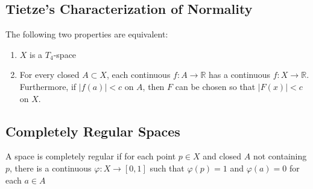 \documentclass[12pt]{article} %
\begin{document}
\subsection{Tietze's Characterization of Normality}

\begin{theorem}\parencite{Dugundji1966} The following two properties are equivalent:
\begin{enumerate}
    \item $X$ is a $T_4$-space
    \item For every closed $A \subset X$, each continuous $f:A \to \mathbb{R}$ has a continuous $f:X\to \mathbb{R}$. Furthermore, if $|f(a)|<c$ on $A$, then $F$ can be chosen so that $|F(x)|<c$ on $X$.
\end{enumerate}
\end{theorem}



\subsection{Completely Regular Spaces}

\begin{definition}\parencite{Dugundji1966} A space is completely regular  if for each point $p\in X$ and closed $A$ not containing $p$, there is a continuous $\varphi:X \to [0,1]$ such that $\varphi(p)=1$ and $\varphi(a)=0$ for each $a\in A$
\end{definition}
\end{document}
